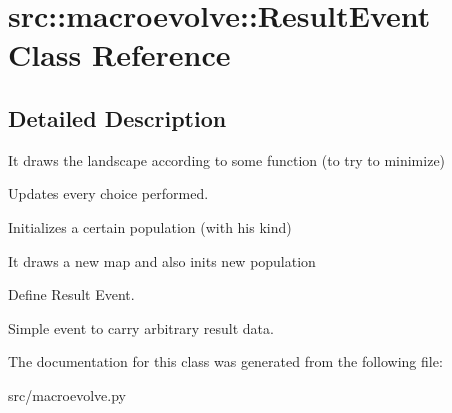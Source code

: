 \hypertarget{classsrc_1_1macroevolve_1_1ResultEvent}{
\section{src::macroevolve::ResultEvent Class Reference}
\label{classsrc_1_1macroevolve_1_1ResultEvent}
}


\subsection{Detailed Description}
\begin{DoxyVerb}
    It draws the landscape according to some function (to try to minimize)
    \end{DoxyVerb}
 \begin{DoxyVerb}
    Updates every choice performed.
    \end{DoxyVerb}
 \begin{DoxyVerb}
    Initializes a certain population (with his kind)
    \end{DoxyVerb}
 \begin{DoxyVerb}
    It draws a new map and also inits new population
    \end{DoxyVerb}
 \begin{DoxyVerb}Define Result Event.\end{DoxyVerb}
 \begin{DoxyVerb}Simple event to carry arbitrary result data.\end{DoxyVerb}
 

The documentation for this class was generated from the following file:\begin{DoxyCompactItemize}
\item 
src/macroevolve.py\end{DoxyCompactItemize}
